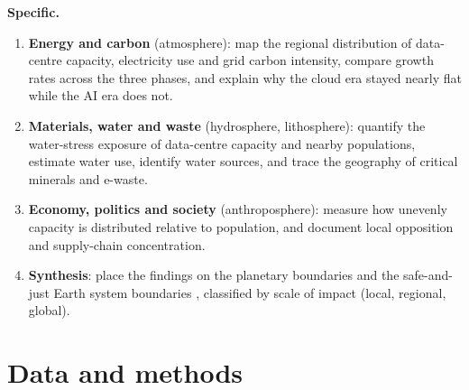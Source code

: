 \documentclass[10pt,a4paper]{article}
\begin{document}
\textbf{Specific.}
\begin{enumerate}[label=\textbf{O\arabic*}]
  \item \textbf{Energy and carbon} (atmosphere): map the regional distribution of data-centre capacity, electricity use and grid carbon intensity, compare growth rates across the three phases, and explain why the cloud era stayed nearly flat while the AI era does not.
  \item \textbf{Materials, water and waste} (hydrosphere, lithosphere): quantify the water-stress exposure of data-centre capacity and nearby populations, estimate water use, identify water sources, and trace the geography of critical minerals and e-waste.
  \item \textbf{Economy, politics and society} (anthroposphere): measure how unevenly capacity is distributed relative to population, and document local opposition and supply-chain concentration.
  \item \textbf{Synthesis}: place the findings on the planetary boundaries \citep{phc2025} and the safe-and-just Earth system boundaries \citep{rockstrom2023}, classified by scale of impact (local, regional, global).
\end{enumerate}

\section{Data and methods}
\end{document}
